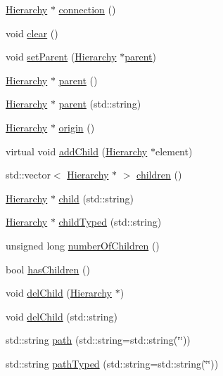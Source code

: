 \begin{DoxyCompactItemize}
\item 
\hyperlink{classHierarchy}{Hierarchy} $\ast$ \hyperlink{classElement_af57444353c1ddf9fa0109801e97debf7}{connection} ()
\item 
void \hyperlink{classHierarchy_af4d43b0765b402670eed2d62c73405af}{clear} ()
\item 
void \hyperlink{classHierarchy_a585ad1aeec16077a0e532ab8b4fc557b}{set\+Parent} (\hyperlink{classHierarchy}{Hierarchy} $\ast$\hyperlink{classHierarchy_a1c7bec8257e717f9c1465e06ebf845fc}{parent})
\item 
\hyperlink{classHierarchy}{Hierarchy} $\ast$ \hyperlink{classHierarchy_a1c7bec8257e717f9c1465e06ebf845fc}{parent} ()
\item 
\hyperlink{classHierarchy}{Hierarchy} $\ast$ \hyperlink{classHierarchy_ad550588733bf75ac5c0fcfd7c8fd11a6}{parent} (std\+::string)
\item 
\hyperlink{classHierarchy}{Hierarchy} $\ast$ \hyperlink{classHierarchy_aee461dc930ce3871636ff87f075b1b83}{origin} ()
\item 
virtual void \hyperlink{classHierarchy_ad677774ff38fcb257c04a3a10d471fac}{add\+Child} (\hyperlink{classHierarchy}{Hierarchy} $\ast$element)
\item 
std\+::vector$<$ \hyperlink{classHierarchy}{Hierarchy} $\ast$ $>$ \hyperlink{classHierarchy_aa9a76f69e98e052ee1a6e32cea006288}{children} ()
\item 
\hyperlink{classHierarchy}{Hierarchy} $\ast$ \hyperlink{classHierarchy_a1e207f973c694b538bf90107b4868817}{child} (std\+::string)
\item 
\hyperlink{classHierarchy}{Hierarchy} $\ast$ \hyperlink{classHierarchy_a0c15a5276a3b80b4354d6bd8a01e0708}{child\+Typed} (std\+::string)
\item 
unsigned long \hyperlink{classHierarchy_ab16e84de65fd84e14001a6cf941c8be4}{number\+Of\+Children} ()
\item 
bool \hyperlink{classHierarchy_a255174fe4d316d2a3f430dcb9dab29f1}{has\+Children} ()
\item 
void \hyperlink{classHierarchy_a2b2b359fac003233f65786a616766bde}{del\+Child} (\hyperlink{classHierarchy}{Hierarchy} $\ast$)
\item 
void \hyperlink{classHierarchy_a1928ac7615fe0b5e55cd707f70dc6781}{del\+Child} (std\+::string)
\item 
std\+::string \hyperlink{classHierarchy_aa7990fa7caf132d83e361ce033c6c65a}{path} (std\+::string=std\+::string(\char`\"{}\char`\"{}))
\item 
std\+::string \hyperlink{classHierarchy_a1efd56cd164d328d2002e53a10a19b8c}{path\+Typed} (std\+::string=std\+::string(\char`\"{}\char`\"{}))

\end{DoxyCompactItemize}
